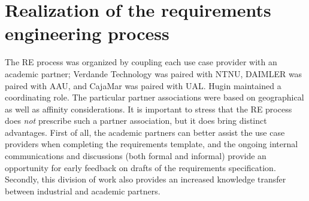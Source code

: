 
\section{Realization of the requirements engineering process}
\label{sec:realization}

The RE process was organized by coupling each use case provider with an
academic partner; Verdande Technology was paired with NTNU, DAIMLER was paired with AAU, and CajaMar was paired with
UAL. Hugin maintained a coordinating role. The particular partner associations were based on geographical as well as affinity
considerations. It is important to stress that the RE process does \emph{not} prescribe such a
partner association, but it does bring distinct advantages. First of all, the academic partners can better assist the use case
providers when completing the requirements template, and the ongoing internal communications and discussions (both formal
and informal) provide an opportunity for early feedback on drafts of the requirements
specification. Secondly, this division of work also provides an increased knowledge transfer between industrial and academic
partners. 





